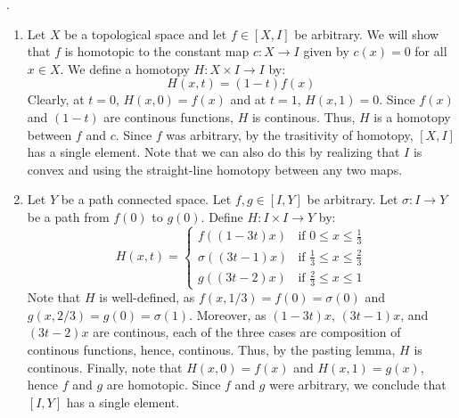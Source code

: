 \documentclass[12pt]{article}
\begin{document}
\begin{solu} .
    \begin{enumerate}
        \item Let $X$ be a topological space and let $f \in [X, I]$ be arbitrary. We will show that $f$ is homotopic to the constant map $c: X \to I$ given by $c(x) = 0$ for all $x \in X$. We define a homotopy $H: X \times I \to I$ by:
        \[ H(x, t) = (1-t)f(x) \] 
        Clearly, at $t = 0$, $H(x, 0) = f(x)$ and at $t = 1$, $H(x, 1) = 0$. Since $f(x)$ and $(1-t)$ are continous functions, $H$ is continous. Thus, $H$ is a homotopy between $f$ and $c$. Since $f$ was arbitrary, by the trasitivity of homotopy, $[X,I]$ has a single element. \bbni  
        Note that we can also do this by realizing that $I$ is convex and using the straight-line homotopy between any two maps. 
        \item Let $Y$ be a path connected space. Let $f, g \in [I, Y]$ be arbitrary. Let $\sigma: I \to Y$ be a path from $f(0)$ to $g(0)$. Define $H: I \times I \to Y$ by:
        \[ H(x, t) = \begin{cases}
            f((1-3t)x) & \text{if } 0 \leq x \leq \frac{1}{3} \\
            \sigma((3t - 1)x) & \text{if } \frac{1}{3} \leq x \leq \frac{2}{3} \\
            g((3t-2)x) & \text{if } \frac{2}{3  } \leq x \leq 1
        \end{cases} \]
        Note that $H$ is well-defined, as $f(x, 1/3) = f(0) = \sigma(0)$ and $g(x, 2/3) = g(0) = \sigma(1)$. Moreover, as $(1-3t)x$, $(3t-1)x$, and $(3t-2)x$ are continous, each of the three cases are composition of continous functions, hence, continous. Thus, by the pasting lemma, $H$ is continous. \bbni 
        Finally, note that $H(x, 0) = f(x)$ and $H(x, 1) = g(x)$, hence $f$ and $g$ are homotopic. Since $f$ and $g$ were arbitrary, we conclude that $[I,Y]$ has a single element.
    \end{enumerate}

\end{solu}
\newpage
\end{document}
